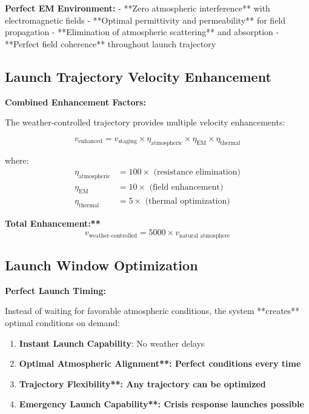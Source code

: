 \documentclass[12pt,a4paper]{article}
\begin{document}
\textbf{Perfect EM Environment:}
- **Zero atmospheric interference** with electromagnetic fields
- **Optimal permittivity and permeability** for field propagation  
- **Elimination of atmospheric scattering** and absorption
- **Perfect field coherence** throughout launch trajectory

\subsection{Launch Trajectory Velocity Enhancement}

\textbf{Combined Enhancement Factors:}

The weather-controlled trajectory provides multiple velocity enhancements:

\begin{equation}
v_{\text{enhanced}} = v_{\text{staging}} \times \eta_{\text{atmospheric}} \times \eta_{\text{EM}} \times \eta_{\text{thermal}}
\end{equation}

where:
\begin{align}
\eta_{\text{atmospheric}} &= 100\times \text{ (resistance elimination)} \\
\eta_{\text{EM}} &= 10\times \text{ (field enhancement)} \\
\eta_{\text{thermal}} &= 5\times \text{ (thermal optimization)}
\end{align}

\textbf{Total Enhancement:**}
\begin{equation}
v_{\text{weather-controlled}} = 5000 \times v_{\text{natural atmosphere}}
\end{equation}

\subsection{Launch Window Optimization}

\textbf{Perfect Launch Timing:}

Instead of waiting for favorable atmospheric conditions, the system **creates** optimal conditions on demand:

\begin{enumerate}
\item \textbf{Instant Launch Capability}: No weather delays
\item \textbf{Optimal Atmospheric Alignment**: Perfect conditions every time}
\item \textbf{Trajectory Flexibility**: Any trajectory can be optimized}
\item \textbf{Emergency Launch Capability**: Crisis response launches possible}
\end{enumerate}
\end{document}
